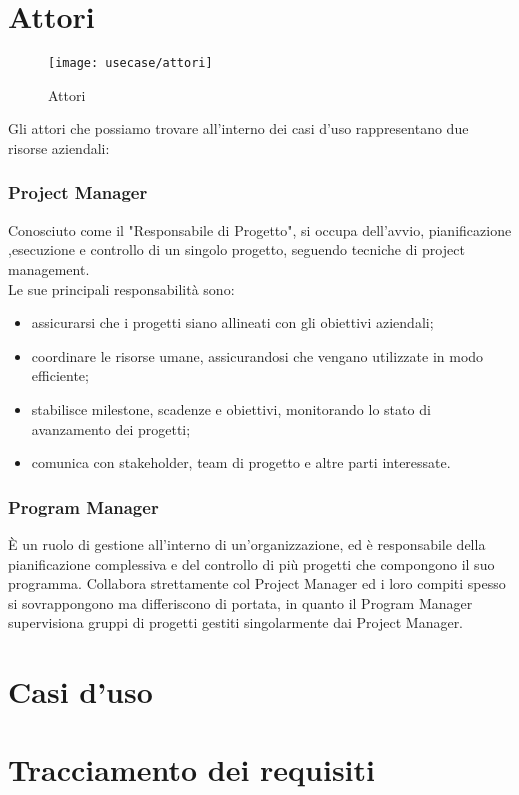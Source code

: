 \section{Attori}
\begin{figure}[H] 
    \centering 
    \texttt{[image: usecase/attori]} 
    \caption{Attori}
\end{figure}
Gli attori che possiamo trovare all'interno dei casi d'uso rappresentano due risorse aziendali:
\subsubsection*{Project Manager}
Conosciuto come il "Responsabile di Progetto", si occupa dell'avvio, pianificazione ,esecuzione e controllo di un singolo progetto, seguendo tecniche di project management.\\
Le sue principali responsabilità sono:
\begin{itemize}
\item assicurarsi che i progetti siano allineati con gli obiettivi aziendali;
\item coordinare le risorse umane, assicurandosi che vengano utilizzate in modo efficiente;
\item stabilisce milestone, scadenze e obiettivi, monitorando lo stato di avanzamento dei progetti;
\item comunica con stakeholder, team di progetto e altre parti interessate.
\end{itemize}
\subsubsection*{Program Manager}
È un ruolo di gestione all'interno di un'organizzazione, ed è responsabile della pianificazione complessiva e del controllo di più progetti che compongono il suo programma. Collabora strettamente col Project Manager ed i loro compiti spesso si sovrappongono ma differiscono di portata, in quanto il Program Manager supervisiona gruppi di progetti gestiti singolarmente dai Project Manager.

\section{Casi d'uso}









\section{Tracciamento dei requisiti}


 

